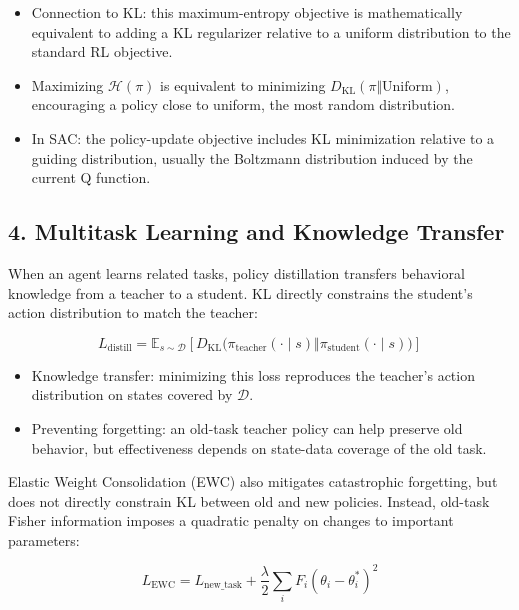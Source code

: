 \begin{itemize}
\tightlist
\item
  Connection to KL: this maximum-entropy objective is mathematically equivalent to adding a KL regularizer relative to a uniform distribution to the standard RL objective.
\item
  Maximizing \(\mathcal{H}(\pi)\) is equivalent to minimizing \(D_{\mathrm{KL}}(\pi\Vert\mathrm{Uniform})\), encouraging a policy close to uniform, the most random distribution.
\item
  In SAC: the policy-update objective includes KL minimization relative to a guiding distribution, usually the Boltzmann distribution induced by the current Q function.
\end{itemize}

\hypertarget{multitask-learning-and-knowledge-transfer}{%
\subsection{4. Multitask Learning and Knowledge Transfer}\label{multitask-learning-and-knowledge-transfer}}

When an agent learns related tasks, policy distillation transfers behavioral knowledge from a teacher to a student. KL directly constrains the student's action distribution to match the teacher:

\[
L_{\mathrm{distill}}
=
\mathbb{E}_{s\sim\mathcal{D}}
\left[
D_{\mathrm{KL}}\bigl(
\pi_{\mathrm{teacher}}(\cdot\mid s)
\Vert
\pi_{\mathrm{student}}(\cdot\mid s)
\bigr)
\right]
\]

\begin{itemize}
\tightlist
\item
  Knowledge transfer: minimizing this loss reproduces the teacher's action distribution on states covered by \(\mathcal{D}\).
\item
  Preventing forgetting: an old-task teacher policy can help preserve old behavior, but effectiveness depends on state-data coverage of the old task.
\end{itemize}

Elastic Weight Consolidation (EWC) also mitigates catastrophic forgetting, but does not directly constrain KL between old and new policies. Instead, old-task Fisher information imposes a quadratic penalty on changes to important parameters:

\[
L_{\mathrm{EWC}}
=
L_{\mathrm{new\_task}}
+
\frac{\lambda}{2}
\sum_i F_i(\theta_i-\theta_i^{*})^{2}
\]

